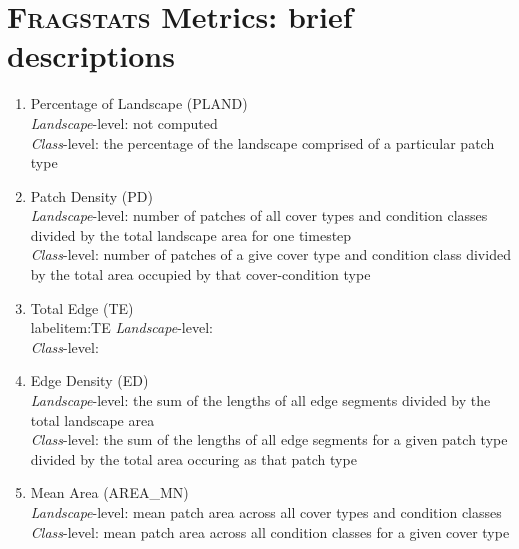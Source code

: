 \chapter{\textsc{Fragstats} Metrics: brief descriptions}
\label{app:metricdescriptions}
\begin{enumerate}
	\item Percentage of Landscape (PLAND)\\
	\emph{Landscape}-level: not computed\\
	\emph{Class}-level: the percentage of the landscape comprised of a particular patch type\\
	
	
	\item Patch Density (PD)\\
	\emph{Landscape}-level: number of patches of all cover types and condition classes divided by the total landscape area for one timestep\\
	\emph{Class}-level: number of patches of a give cover type and condition class divided by the total area occupied by that cover-condition type
\\

	\item Total Edge (TE) \\
	label{item:TE}
	\emph{Landscape}-level:      \\
	\emph{Class}-level:         \\
	
	\item Edge Density (ED) \\
	\label{item:ED}
	\emph{Landscape}-level: the sum of the lengths of all edge segments divided by the total landscape area\\	
	\emph{Class}-level: the sum of the lengths of all edge segments for a given patch type divided by the total area occuring as that patch type\\
	
	\item Mean Area (AREA\_MN)\\
	\emph{Landscape}-level:  mean patch area across all cover types and condition classes\\
	\emph{Class}-level:  mean patch area across all condition classes for a given cover type\\
	

\end{enumerate}
